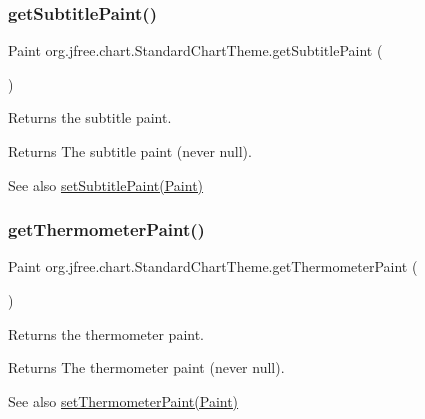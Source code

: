 \subsubsection{\texorpdfstring{get\+Subtitle\+Paint()}{getSubtitlePaint()}}
{\footnotesize\ttfamily Paint org.\+jfree.\+chart.\+Standard\+Chart\+Theme.\+get\+Subtitle\+Paint (\begin{DoxyParamCaption}{ }\end{DoxyParamCaption})}

Returns the subtitle paint.

\begin{DoxyReturn}{Returns}
The subtitle paint (never {\ttfamily null}).
\end{DoxyReturn}
\begin{DoxySeeAlso}{See also}
\mbox{\hyperlink{classorg_1_1jfree_1_1chart_1_1_standard_chart_theme_afd19c18a9662dbcea79896ccea56bc74}{set\+Subtitle\+Paint(\+Paint)}} 
\end{DoxySeeAlso}
\mbox{\label{classorg_1_1jfree_1_1chart_1_1_standard_chart_theme_a36af217e64d242998f929ff25f632c57}} 
\subsubsection{\texorpdfstring{get\+Thermometer\+Paint()}{getThermometerPaint()}}
{\footnotesize\ttfamily Paint org.\+jfree.\+chart.\+Standard\+Chart\+Theme.\+get\+Thermometer\+Paint (\begin{DoxyParamCaption}{ }\end{DoxyParamCaption})}

Returns the thermometer paint.

\begin{DoxyReturn}{Returns}
The thermometer paint (never {\ttfamily null}).
\end{DoxyReturn}
\begin{DoxySeeAlso}{See also}
\mbox{\hyperlink{classorg_1_1jfree_1_1chart_1_1_standard_chart_theme_a581aacf90e7f0e85d5365218c2d635b4}{set\+Thermometer\+Paint(\+Paint)}} 
\end{DoxySeeAlso}
\mbox{\label{classorg_1_1jfree_1_1chart_1_1_standard_chart_theme_a03ff424d91a3eb843b595f599089197c}} 
